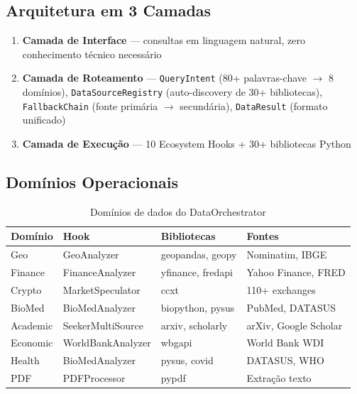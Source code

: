 \documentclass[12pt,a4paper]{article}
\begin{document}
\subsection{Arquitetura em 3 Camadas}

\begin{enumerate}[itemsep=2pt]
  \item \textbf{Camada de Interface} — consultas em linguagem natural, zero conhecimento técnico necessário
  \item \textbf{Camada de Roteamento} — \texttt{QueryIntent} (80+ palavras-chave $\rightarrow$ 8 domínios), \texttt{DataSourceRegistry} (auto-discovery de 30+ bibliotecas), \texttt{FallbackChain} (fonte primária $\rightarrow$ secundária), \texttt{DataResult} (formato unificado)
  \item \textbf{Camada de Execução} — 10 Ecosystem Hooks + 30+ bibliotecas Python
\end{enumerate}

\subsection{Domínios Operacionais}

\begin{table}[H]
  \centering
  \caption{Domínios de dados do DataOrchestrator}
  \label{tab:domains}
  \begin{tabular}{l l l l}
    \toprule
    \textbf{Domínio} & \textbf{Hook} & \textbf{Bibliotecas} & \textbf{Fontes} \\
    \midrule
    Geo       & GeoAnalyzer       & geopandas, geopy   & Nominatim, IBGE \\
    Finance   & FinanceAnalyzer   & yfinance, fredapi  & Yahoo Finance, FRED \\
    Crypto    & MarketSpeculator  & ccxt               & 110+ exchanges \\
    BioMed    & BioMedAnalyzer    & biopython, pysus   & PubMed, DATASUS \\
    Academic  & SeekerMultiSource & arxiv, scholarly   & arXiv, Google Scholar \\
    Economic  & WorldBankAnalyzer & wbgapi             & World Bank WDI \\
    Health    & BioMedAnalyzer    & pysus, covid       & DATASUS, WHO \\
    PDF       & PDFProcessor      & pypdf              & Extração texto \\
    \bottomrule
  \end{tabular}
\end{table}
\end{document}

